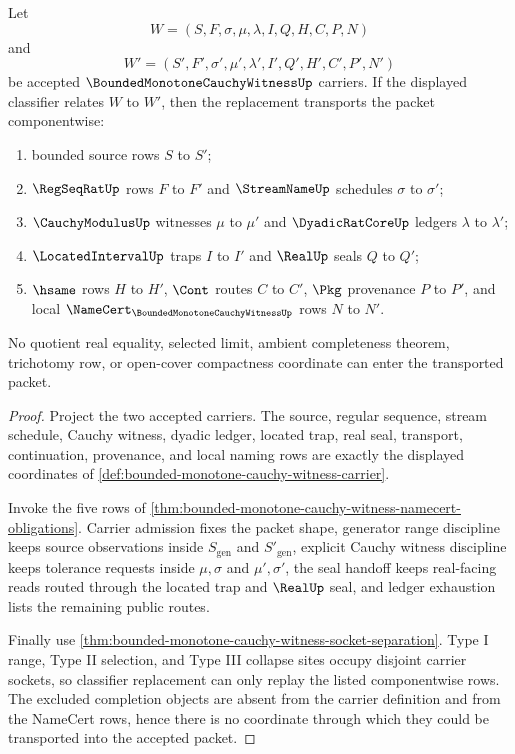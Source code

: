 \begin{theorem}
\label{thm:bounded-monotone-cauchy-witness-classifier-transport}
Let
$$
W=(S,F,\sigma,\mu,\lambda,I,Q,H,C,P,N)
$$
and
$$
W'=(S',F',\sigma',\mu',\lambda',I',Q',H',C',P',N')
$$
be accepted $\BoundedMonotoneCauchyWitnessUp$ carriers. If the displayed classifier relates $W$ to $W'$, then the replacement transports the packet componentwise:
\begin{enumerate}
\item bounded source rows $S$ to $S'$;
\item $\RegSeqRatUp$ rows $F$ to $F'$ and $\StreamNameUp$ schedules $\sigma$ to $\sigma'$;
\item $\CauchyModulusUp$ witnesses $\mu$ to $\mu'$ and $\DyadicRatCoreUp$ ledgers $\lambda$ to $\lambda'$;
\item $\LocatedIntervalUp$ traps $I$ to $I'$ and $\RealUp$ seals $Q$ to $Q'$;
\item $\hsame$ rows $H$ to $H'$, $\Cont$ routes $C$ to $C'$, $\Pkg$ provenance $P$ to $P'$, and local $\NameCert_{\BoundedMonotoneCauchyWitnessUp}$ rows $N$ to $N'$.
\end{enumerate}

No quotient real equality, selected limit, ambient completeness theorem, trichotomy row, or open-cover compactness coordinate can enter the transported packet.
\end{theorem}
\begin{proof}
Project the two accepted carriers. The source, regular sequence, stream schedule, Cauchy witness, dyadic ledger, located trap, real seal, transport, continuation, provenance, and local naming rows are exactly the displayed coordinates of \autoref{def:bounded-monotone-cauchy-witness-carrier}.

Invoke the five rows of \autoref{thm:bounded-monotone-cauchy-witness-namecert-obligations}. Carrier admission fixes the packet shape, generator range discipline keeps source observations inside $S_{\mathrm{gen}}$ and $S'_{\mathrm{gen}}$, explicit Cauchy witness discipline keeps tolerance requests inside $\mu,\sigma$ and $\mu',\sigma'$, the seal handoff keeps real-facing reads routed through the located trap and $\RealUp$ seal, and ledger exhaustion lists the remaining public routes.

Finally use \autoref{thm:bounded-monotone-cauchy-witness-socket-separation}. Type I range, Type II selection, and Type III collapse sites occupy disjoint carrier sockets, so classifier replacement can only replay the listed componentwise rows. The excluded completion objects are absent from the carrier definition and from the NameCert rows, hence there is no coordinate through which they could be transported into the accepted packet.
\end{proof}

